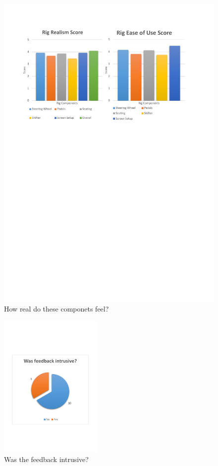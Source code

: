 \begin{figure}[!htb]
	\centering
	\includegraphics[width=\textwidth]{charts/realistic.pdf}
	\caption[Participants rig realisim score]{How real do these componets feel?}
\label{fig:chart-realistic}
\end{figure}

\begin{figure}[!htb]
	\centering
	\includegraphics[height=7cm]{charts/intrusivefeedback.pdf}
	\caption{Was the feedback intrusive?}
\label{fig:chart-intrusivefeedback}
\end{figure}
%
%
%
%

